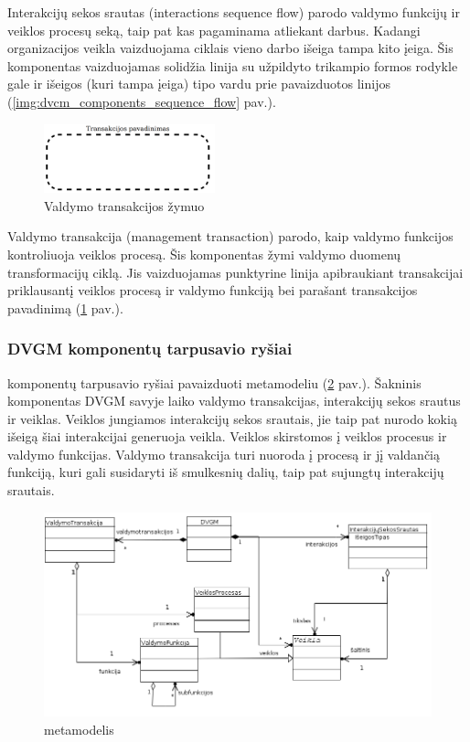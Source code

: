 Interakcijų sekos srautas (interactions sequence flow) parodo valdymo funkcijų ir veiklos procesų seką, taip pat kas pagaminama atliekant darbus. Kadangi organizacijos veikla vaizduojama ciklais vieno darbo išeiga tampa kito įeiga. Šis komponentas vaizduojamas solidžia linija su užpildyto trikampio formos rodykle
gale ir išeigos (kuri tampa įeiga) tipo vardu prie pavaizduotos linijos (\ref{img:dvcm_components_sequence_flow} pav.).

\begin{figure}[H]
	\centering
	\includegraphics[height=2cm]{img/dvcm_components/management_transaction}
	\caption{Valdymo transakcijos žymuo}
	\label{img:dvcm_components_management_transaction}
\end{figure}

Valdymo transakcija (management transaction) parodo, kaip valdymo funkcijos kontroliuoja veiklos procesą. Šis komponentas žymi valdymo duomenų transformacijų ciklą. Jis vaizduojamas punktyrine linija apibraukiant transakcijai priklausantį veiklos procesą ir valdymo funkciją bei parašant transakcijos pavadinimą
(\ref{img:dvcm_components_management_transaction} pav.).

\subsubsection{DVGM komponentų tarpusavio ryšiai}

\DVCM{} komponentų tarpusavio ryšiai pavaizduoti metamodeliu (\ref{img:dvcm_metamodel} pav.). Šakninis komponentas DVGM savyje laiko valdymo transakcijas, interakcijų sekos srautus ir veiklas. Veiklos jungiamos interakcijų sekos srautais, jie taip pat nurodo kokią išeigą šiai interakcijai generuoja veikla. Veiklos skirstomos į veiklos procesus ir valdymo funkcijas. Valdymo transakcija turi nuoroda į procesą ir jį valdančią funkciją, kuri gali susidaryti iš smulkesnių dalių, taip pat sujungtų interakcijų srautais.

\begin{figure}[H]
	\centering
	\includegraphics[width=\textwidth]{sections/modeling_methods_and_languages/img/dvcm_metamodel}
	\caption{\DVCM{} metamodelis}
	\label{img:dvcm_metamodel}
\end{figure}


